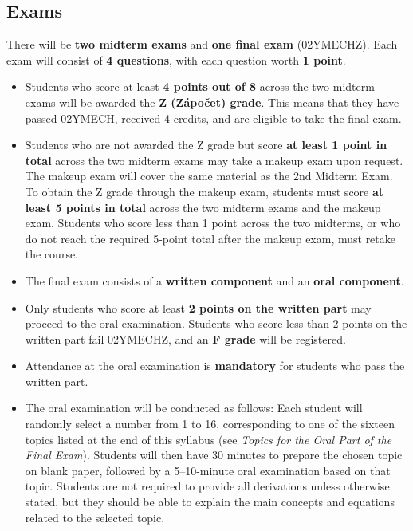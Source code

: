 \documentclass[11pt]{article}
\begin{document}
\newpage

\subsection*{Exams}

There will be \textbf{two midterm exams} and \textbf{one final exam} (02YMECHZ). Each exam will consist of \textbf{4 questions}, with each question worth \textbf{1 point}.

\begin{itemize}

	\item Students who score at least \textbf{4 points out of 8} across the \underline{two midterm exams} will be awarded the \textbf{Z (Zápočet) grade}. This means that they have passed 02YMECH, received 4 credits, and are eligible to take the final exam.

\item Students who are not awarded the Z grade but score \textbf{at least 1 point in total} across the two midterm exams may take a makeup exam upon request. The makeup exam will cover the same material as the 2nd Midterm Exam. To obtain the Z grade through the makeup exam, students must score \textbf{at least 5 points in total} across the two midterm exams and the makeup exam. Students who score less than 1 point across the two midterms, or who do not reach the required 5-point total after the makeup exam, must retake the course.

\item The final exam consists of a \textbf{written component} and an \textbf{oral component}.

\item Only students who score at least \textbf{2 points on the written part} may proceed to the oral examination. Students who score less than 2 points on the written part fail 02YMECHZ, and an \textbf{F grade} will be registered.

\item Attendance at the oral examination is \textbf{mandatory} for students who pass the written part.

\item The oral examination will be conducted as follows: Each student will randomly select a number from 1 to 16, corresponding to one of the sixteen topics listed at the end of this syllabus (see \emph{Topics for the Oral Part of the Final Exam}). Students will then have 30 minutes to prepare the chosen topic on blank paper, followed by a 5--10-minute oral examination based on that topic. Students are not required to provide all derivations unless otherwise stated, but they should be able to explain the main concepts and equations related to the selected topic.


\end{itemize}
\end{document}
